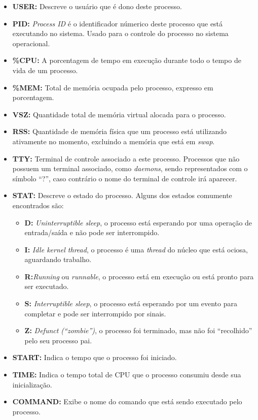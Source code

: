 \documentclass[
	12pt,				%
	oneside,   	        %
	a4paper,			%
	english,			%
	french,				%
	spanish,			%
	brazil,				%
	]{pacotes/abntex2}
\begin{document}
\begin{itemize}
    \item \textbf{USER:} Descreve o usuário que é dono deste processo.
    
    \item \textbf{PID:} \textit{Process ID} é o identificador númerico deste processo que está executando no sistema. Usado para o controle do processo no sistema operacional.
    \item \textbf{\%CPU:} A porcentagem de tempo em execução durante todo o tempo de vida de um processo.
    
    \item \textbf{\%MEM:} Total de memória ocupada pelo processo, expresso em porcentagem.
    
    \item \textbf{VSZ:} Quantidade total de memória virtual alocada para o processo.
    
    \item \textbf{RSS:} Quantidade de memória física que um processo está utilizando ativamente no momento, excluindo a memória que está em \textit{swap}.
    
    \item \textbf{TTY:} Terminal de controle associado a este processo. Processos que não possuem um terminal associado, como \textit{daemons}, sendo representados com o símbolo ``?'', caso contrário o nome do terminal de controle irá aparecer.
    
    \item \textbf{STAT:} Descreve o estado do processo. Alguns dos estados comumente encontrados são:
    
    \begin{itemize}
        \item \textbf{D:} \textit{Uninterruptible sleep}, o processo está esperando por uma operação de entrada/saída e não pode ser interrompido.
        \item \textbf{I:} \textit{Idle kernel thread}, o processo é uma \textit{thread} do núcleo que está ociosa, aguardando trabalho.
        \item \textbf{R:}\textit{Running} ou \textit{runnable}, o processo está em execução ou está pronto para ser executado.
        \item \textbf{S:} \textit{Interruptible sleep}, o processo está esperando por um evento para completar e pode ser interrompido por sinais.
        \item \textbf{Z:} \textit{Defunct (``zombie'')}, o processo foi terminado, mas não foi ``recolhido'' pelo seu processo pai.
    \end{itemize}
    
    \item \textbf{START:} Indica o tempo que o processo foi iniciado.
    
    \item \textbf{TIME:} Indica o tempo total de CPU que o processo consumiu desde sua inicialização.
    
    \item \textbf{COMMAND:} Exibe o nome do comando que está sendo executado pelo processo.
\end{itemize}
\end{document}

